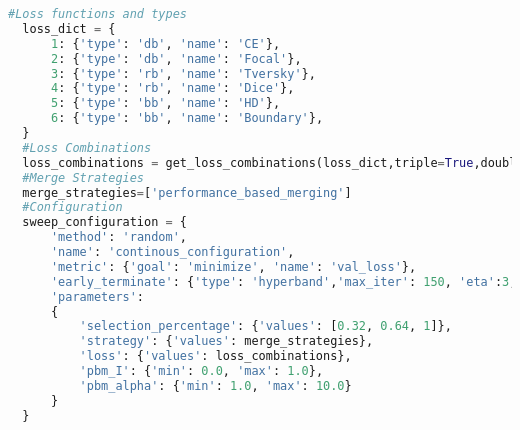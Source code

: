 \begin{lstlisting}[style=mystyle,language=Python,numbers=none,caption={The \texttt{Performance-based} configuration investigates 20 distinct loss function combinations alongside the performance-based merging strategy which involves incorporating a continuous search space. By utilizing a random selection approach within the Hyperband framework, the sweep configuration aims to identify an optimal set of hyperparameters effectively.}]
  #Loss functions and types
  loss_dict = {
      1: {'type': 'db', 'name': 'CE'},
      2: {'type': 'db', 'name': 'Focal'},
      3: {'type': 'rb', 'name': 'Tversky'},
      4: {'type': 'rb', 'name': 'Dice'},
      5: {'type': 'bb', 'name': 'HD'},
      6: {'type': 'bb', 'name': 'Boundary'},
  }
  #Loss Combinations
  loss_combinations = get_loss_combinations(loss_dict,triple=True,double=True,baseline=False)
  #Merge Strategies
  merge_strategies=['performance_based_merging']
  #Configuration
  sweep_configuration = {
      'method': 'random',
      'name': 'continous_configuration',
      'metric': {'goal': 'minimize', 'name': 'val_loss'},
      'early_terminate': {'type': 'hyperband','max_iter': 150, 'eta':3, 's': 2},
      'parameters':
      {   
          'selection_percentage': {'values': [0.32, 0.64, 1]},
          'strategy': {'values': merge_strategies},
          'loss': {'values': loss_combinations},
          'pbm_I': {'min': 0.0, 'max': 1.0},
          'pbm_alpha': {'min': 1.0, 'max': 10.0}
      }
  }
\end{lstlisting}

